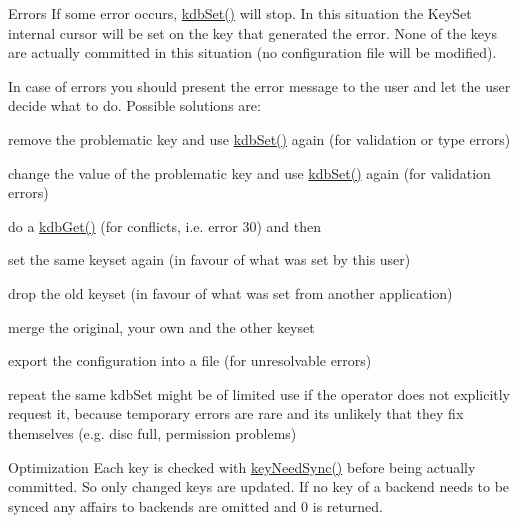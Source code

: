 \begin{DoxyParagraph}{Errors}
If some error occurs, \hyperlink{group__kdb_ga11436b058408f83d303ca5e996832bcf}{kdb\+Set()} will stop. In this situation the Key\+Set internal cursor will be set on the key that generated the error. None of the keys are actually committed in this situation (no configuration file will be modified).
\end{DoxyParagraph}
In case of errors you should present the error message to the user and let the user decide what to do. Possible solutions are\+:
\begin{DoxyItemize}
\item remove the problematic key and use \hyperlink{group__kdb_ga11436b058408f83d303ca5e996832bcf}{kdb\+Set()} again (for validation or type errors)
\item change the value of the problematic key and use \hyperlink{group__kdb_ga11436b058408f83d303ca5e996832bcf}{kdb\+Set()} again (for validation errors)
\item do a \hyperlink{group__kdb_ga28e385fd9cb7ccfe0b2f1ed2f62453a1}{kdb\+Get()} (for conflicts, i.\+e. error 30) and then
\begin{DoxyItemize}
\item set the same keyset again (in favour of what was set by this user)
\item drop the old keyset (in favour of what was set from another application)
\item merge the original, your own and the other keyset
\end{DoxyItemize}
\item export the configuration into a file (for unresolvable errors)
\item repeat the same kdb\+Set might be of limited use if the operator does not explicitly request it, because temporary errors are rare and its unlikely that they fix themselves (e.\+g. disc full, permission problems)
\end{DoxyItemize}

\begin{DoxyParagraph}{Optimization}
Each key is checked with \hyperlink{group__keytest_gaf247df0de7aca04b32ef80e39ef12950}{key\+Need\+Sync()} before being actually committed. So only changed keys are updated. If no key of a backend needs to be synced any affairs to backends are omitted and 0 is returned.
\end{DoxyParagraph}

